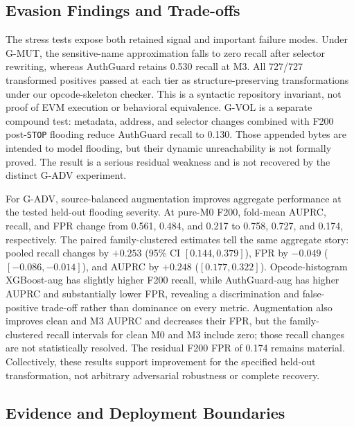 \subsection{Evasion Findings and Trade-offs}

The stress tests expose both retained signal and important failure modes. Under G-MUT, the sensitive-name approximation falls to zero recall after selector rewriting, whereas AuthGuard retains 0.530 recall at M3. All 727/727 transformed positives passed at each tier as structure-preserving transformations under our opcode-skeleton checker. This is a syntactic repository invariant, not proof of EVM execution or behavioral equivalence. G-VOL is a separate compound test: metadata, address, and selector changes combined with F200 post-\texttt{STOP} flooding reduce AuthGuard recall to 0.130. Those appended bytes are intended to model flooding, but their dynamic unreachability is not formally proved. The result is a serious residual weakness and is not recovered by the distinct G-ADV experiment.

For G-ADV, source-balanced augmentation improves aggregate performance at the tested held-out flooding severity. At pure-M0 F200, fold-mean AUPRC, recall, and FPR change from 0.561, 0.484, and 0.217 to 0.758, 0.727, and 0.174, respectively. The paired family-clustered estimates tell the same aggregate story: pooled recall changes by $+0.253$ (95\% CI $[0.144,0.379]$), FPR by $-0.049$ ($[-0.086,-0.014]$), and AUPRC by $+0.248$ ($[0.177,0.322]$). Opcode-histogram XGBoost-aug has slightly higher F200 recall, while AuthGuard-aug has higher AUPRC and substantially lower FPR, revealing a discrimination and false-positive trade-off rather than dominance on every metric. Augmentation also improves clean and M3 AUPRC and decreases their FPR, but the family-clustered recall intervals for clean M0 and M3 include zero; those recall changes are not statistically resolved. The residual F200 FPR of 0.174 remains material. Collectively, these results support improvement for the specified held-out transformation, not arbitrary adversarial robustness or complete recovery.

\subsection{Evidence and Deployment Boundaries}

